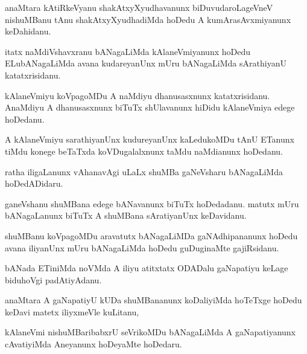 \documentclass{article}
\begin{document}
\begin{mn}%
anaMtara kAtiRkeVyanu shakAtxyXyudhavanunx biDuvudaroLageVneV nishuMBanu tAnu shakAtxyXyudhadiMda 
hoDedu A kumArasAvxmiyanunx keDahidanu.
\end{mn}

\begin{mn}%
itatx naMdiVshavxranu bANagaLiMda kAlaneVmiyanunx hoDedu ELubANagaLiMda avana kudareyanUnx mUru 
bANagaLiMda sArathiyanU katatxrisidanu.
\end{mn}

\begin{mn}%
kAlaneVmiyu koVpagoMDu A naMdiyu dhanusasxnunx katatxrisidanu. AnaMdiyu A dhanusasxnunx biTuTx 
shUlavanunx hiDidu kAlaneVmiya edege hoDedanu.
\end{mn}

\begin{mn}%
A kAlaneVmiyu sarathiyanUnx kudureyanUnx kaLedukoMDu tAnU ETanunx tiMdu konege beTaTxda 
koVDugalalxnunx taMdu naMdianunx hoDedanu.
\end{mn}

\begin{mn}%
ratha iligaLanunx vAhanavAgi uLaLx shuMBa gaNeVsharu bANagaLiMda hoDedADidaru.
\end{mn}

\begin{mn}%
ganeVshanu shuMBana edege bANavanunx biTuTx hoDedadanu. matutx mUru bANagaLanunx biTuTx A shuMBana 
sAratiyanUnx keDavidanu.
\end{mn}

\begin{mn}%
shuMBanu koVpagoMDu aravatutx bANagaLiMDa gaNAdhipananunx hoDedu avana iliyanUnx mUru bANagaLiMda 
hoDedu guDuginaMte gajiRsidanu.
\end{mn}

\begin{mn}%
bANada ETiniMda noVMda A iliyu atitxtatx ODADalu gaNapatiyu keLage biduhoVgi padAtiyAdanu.
\end{mn}

\begin{mn}%
anaMtara A gaNapatiyU kUDa shuMBananunx koDaliyiMda hoTeTxge hoDedu keDavi matetx iliyxmeVle kuLitanu,
\end{mn}

\begin{mn}%
kAlaneVmi nishuMBaribabxrU seVrikoMDu bANagaLiMda A gaNapatiyanunx cAvatiyiMda Aneyanunx hoDeyaMte 
hoDedaru.
\end{mn}
\end{document}
